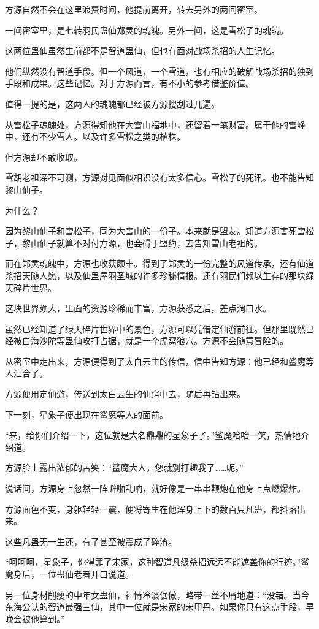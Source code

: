 \begin{this_body}
方源自然不会在这里浪费时间，他提前离开，转去另外的两间密室。

一间密室里，是七转羽民蛊仙郑灵的魂魄。另外一间，这是雪松子的魂魄。

这两位蛊仙虽然生前都不是智道蛊仙，但也有面对战场杀招的人生记忆。

他们纵然没有智道手段。但一个风道，一个雪道，也有相应的破解战场杀招的独到手段和成果。这些记忆。对于方源而言，有不小的参考借鉴价值。

值得一提的是，这两人的魂魄都已经被方源搜刮过几遍。

从雪松子魂魄处，方源得知他在大雪山福地中，还留着一笔财富。属于他的雪峰中，还有不少雪人。以及许多雪松之类的植株。

但方源却不敢收取。

雪胡老祖深不可测，方源对见面似相识没有太多信心。雪松子的死讯。也不能告知黎山仙子。

为什么？

因为黎山仙子和雪松子，同为大雪山的一份子。本来就是盟友。知道方源害死雪松子，黎山仙子就算不对付方源，也会碍于盟约，去告知雪山老祖的。

而在郑灵魂魄中，方源也收获颇丰。得到了郑灵的一份完整的风道传承，还有仙道杀招天随人愿，以及仙蛊屋羽圣城的许多珍秘情报。还有羽民们赖以生存的那块绿天碎片世界。

这块世界颇大，里面的资源珍稀而丰富，方源获悉之后，差点淌口水。

虽然已经知道了绿天碎片世界中的景色，方源可以凭借定仙游前往。但那里既然已经被白海沙陀等蛊仙攻打占据，就是一个虎窝狼穴。方源不会随意冒险的。

从密室中走出来，方源便得到了太白云生的传信，信中告知方源：他已经和鲨魔等人汇合了。

方源便用定仙游，传送到太白云生的仙窍中去，随后再钻出来。

下一刻，星象子便出现在鲨魔等人的面前。

“来，给你们介绍一下，这位就是大名鼎鼎的星象子了。”鲨魔哈哈一笑，热情地介绍道。

方源脸上露出浓郁的苦笑：“鲨魔大人，您就别打趣我了……呃。”

说话间，方源身上忽然一阵噼啪乱响，就好像是一串串鞭炮在他身上点燃爆炸。

方源面色不变，身躯轻轻一震，便将寄生在他浑身上下的数百只凡蛊，都抖落出来。

这些凡蛊无一生还，有了甚至被震成了碎渣。

“呵呵呵，星象子，你得罪了宋家，这种智道凡级杀招远远不能遮盖你的行迹。”鲨魔身后，一位蛊仙老者开口说道。

另一位身材削瘦的中年女蛊仙，神情冷淡倨傲，略带一丝不屑地道：“没错。当今东海公认的智道最强三仙，其中一位就是宋家的宋甲丹。如果你只有这点手段，早晚会被他算到。”


\end{this_body}
